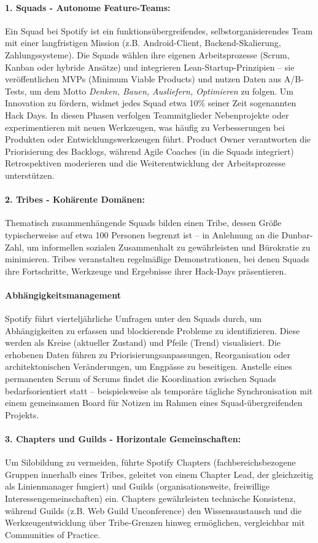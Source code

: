 \paragraph{1. Squads - Autonome Feature-Teams:}Ein Squad bei Spotify ist ein funktionsübergreifendes, selbstorganisierendes Team mit einer langfristigen Mission (z.B. Android-Client, Backend-Skalierung, Zahlungssysteme). 
Die Squads wählen ihre eigenen Arbeitsprozesse (Scrum, Kanban oder hybride Ansätze) und integrieren Lean-Startup-Prinzipien – sie veröffentlichen MVPs (Minimum Viable Products) und nutzen Daten aus A/B-Tests, um dem Motto \textit{Denken, Bauen, Ausliefern, Optimieren} zu folgen.
Um Innovation zu fördern, widmet jedes Squad etwa 10\% seiner Zeit sogenannten Hack Days. In diesen Phasen verfolgen Teammitglieder Nebenprojekte oder experimentieren mit neuen Werkzeugen, was häufig zu Verbesserungen bei Produkten oder Entwicklungswerkzeugen führt. Product Owner verantworten die Priorisierung des Backlogs, während Agile Coaches (in die Squads integriert) Retrospektiven moderieren und die Weiterentwicklung der Arbeitsprozesse unterstützen.
\paragraph{2. Tribes - Kohärente Domänen:}
Thematisch zusammenhängende Squads bilden einen Tribe, dessen Größe typischerweise auf etwa 100 Personen begrenzt ist – in Anlehnung an die Dunbar-Zahl,
um informellen sozialen Zusammenhalt zu gewährleisten und Bürokratie zu minimieren. Tribes veranstalten regelmäßige Demonstrationen, bei denen Squads ihre Fortschritte, Werkzeuge und Ergebnisse ihrer Hack-Days präsentieren.
\paragraph{Abhängigkeitsmanagement}
Spotify führt vierteljährliche Umfragen unter den Squads durch, um Abhängigkeiten zu erfassen und blockierende Probleme zu identifizieren. 
Diese werden als Kreise (aktueller Zustand) und Pfeile (Trend) visualisiert. Die erhobenen Daten führen zu Priorisierungsanpassungen, Reorganisation oder architektonischen Veränderungen, um Engpässe zu beseitigen. 
Anstelle eines permanenten Scrum of Scrums findet die Koordination zwischen Squads bedarfsorientiert statt – beispielsweise als temporäre tägliche Synchronisation mit einem gemeinsamen Board für Notizen im Rahmen eines Squad-übergreifenden Projekts.
\paragraph{3. Chapters und Guilds - Horizontale Gemeinschaften:}
Um Silobildung zu vermeiden, führte Spotify Chapters (fachbereichsbezogene Gruppen innerhalb eines Tribes, geleitet von einem Chapter Lead, der gleichzeitig als Linienmanager fungiert) und Guilds (organisationsweite, freiwillige Interessengemeinschaften) ein. 
Chapters gewährleisten technische Konsistenz, während Guilds (z.B. Web Guild Unconference) den Wissensaustausch und die Werkzeugentwicklung über Tribe-Grenzen hinweg ermöglichen, vergleichbar mit Communities of Practice.
